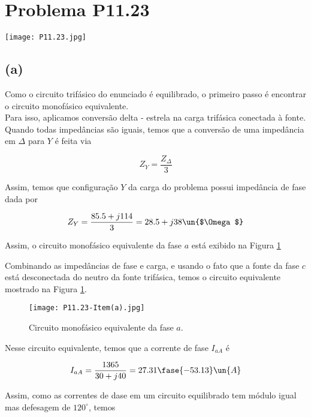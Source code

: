 
\section*{Problema P11.23}

\renewcommand*\thesection{11.23}

\begin{center}
    \texttt{[image: P11.23.jpg]}
\end{center}

\subsection*{(a)}

Como o circuito trifásico do enunciado é equilibrado, o primeiro passo é encontrar o circuito monofásico equivalente. \\
Para isso, aplicamos conversão delta - estrela na carga trifásica conectada à fonte. Quando todas impedâncias são iguais,
temos que a conversão de uma impedância em $\Delta$ para $Y$ é feita via

\begin{equation}\label{eq:11.23.1}
    Z_{Y} = \frac{Z_{\Delta}}{3}
\end{equation}

Assim, temos que configuração $Y$ da carga do problema possui impedância de fase dada por   

\[ Z_Y = \frac{85.5 + j114}{3} = 28.5 +j38 \un{$\Omega$} \]

Assim, o circuito monofásico equivalente da fase $a$ está exibido na Figura \ref*{fig:11.23.1}

Combinando as impedâncias de fase e carga, e usando o fato que a fonte da fase $c$ está desconectada do neutro da fonte trifásica, 
temos o circuito equivalente mostrado na Figura \ref*{fig:11.23.1}.

\begin{figure}[hb]
    \centering
    \caption{Circuito monofásico equivalente da fase $a$.}
      \centering
      \texttt{[image: P11.23-Item(a).jpg]} \\
    \label{fig:11.23.1}
\end{figure}

Nesse circuito equivalente, temos que a corrente de fase $I_{aA}$ é   

\[ I_{aA} = \frac{1365}{30 + j40} = 27.31\fase{-53.13} \un{A} \]

Assim, como as correntes de dase em um circuito equilibrado tem módulo igual mas defesagem de $120^{\circ}$, temos  

